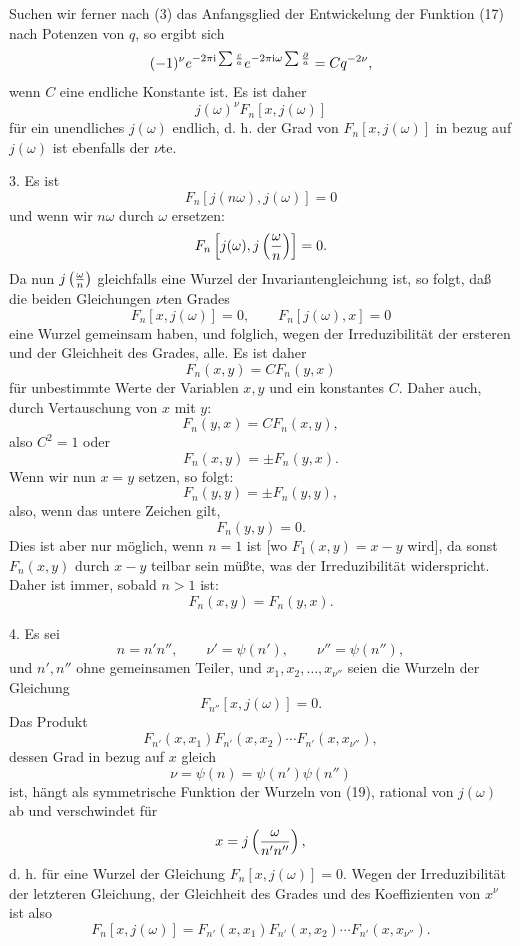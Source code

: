 \documentclass[11pt]{article}
\providecommand{\ii}{\mathrm{i}}
\begin{document}
Suchen wir ferner nach (3) das Anfangsglied der Entwickelung der Funktion (17) nach
Potenzen von $q$, so ergibt sich
\[
 (-1)^\nu e^{-2\pi\ii\sum {c\over a}}e^{-2\pi\ii\omega\sum {\partial\over a}}=Cq^{-2\nu},
\]
wenn $C$ eine endliche Konstante ist. Es ist daher
\[
 j(\omega)^\nu F_n[x,j(\omega)]
\]
für ein unendliches $j(\omega)$ endlich, d. h. der Grad von $F_n[x,j(\omega)]$ in bezug auf
$j(\omega)$ ist ebenfalls der $\nu$te.

3. Es ist
\[
 F_n[j(n\omega),j(\omega)]=0
\]
und wenn wir $n\omega$ durch $\omega$ ersetzen:
\[
 F_n\left[j(\omega),j\left({\omega\over n}\right)\right]=0.
\]
Da nun $j\left({\omega\over n}\right)$ gleichfalls eine Wurzel der Invariantengleichung ist,
so folgt, daß die beiden Gleichungen $\nu$ten Grades
\[
 F_n[x,j(\omega)]=0,
 \qquad
 F_n[j(\omega),x]=0
\]
eine Wurzel gemeinsam haben, und folglich, wegen der Irreduzibilität der ersteren und der
Gleichheit des Grades, alle. Es ist daher
\[
 F_n(x,y)=C F_n(y,x)
\]
für unbestimmte Werte der Variablen $x,y$ und ein konstantes $C$. Daher auch, durch
Vertauschung von $x$ mit $y$:
\[
 F_n(y,x)=C F_n(x,y),
\]
also $C^2=1$ oder
\[
 F_n(x,y)=\pm F_n(y,x).
\]
Wenn wir nun $x=y$ setzen, so folgt:
\[
 F_n(y,y)=\pm F_n(y,y),
\]
also, wenn das untere Zeichen gilt,
\[
 F_n(y,y)=0.
\]
Dies ist aber nur möglich, wenn $n=1$ ist [wo $F_1(x,y)=x-y$ wird], da sonst $F_n(x,y)$
durch $x-y$ teilbar sein müßte, was der Irreduzibilität widerspricht. Daher ist immer,
sobald $n>1$ ist:
\begin{equation}
 F_n(x,y)=F_n(y,x).
\tag{18}
\end{equation}

4. Es sei
\[
 n=n'n'',
 \qquad \nu'=\psi(n'),
 \qquad \nu''=\psi(n''),
\]
und $n',n''$ ohne gemeinsamen Teiler, und $x_1,x_2,\ldots,x_{\nu''}$ seien die Wurzeln
der Gleichung
\begin{equation}
 F_{n''}[x,j(\omega)]=0.
\tag{19}
\end{equation}
Das Produkt
\begin{equation}
 F_{n'}(x,x_1)F_{n'}(x,x_2)\cdots F_{n'}(x,x_{\nu''}),
\tag{20}
\end{equation}
dessen Grad in bezug auf $x$ gleich
\[
 \nu=\psi(n)=\psi(n')\psi(n'')
\]
ist, hängt als symmetrische Funktion der Wurzeln von (19), rational von $j(\omega)$ ab
und verschwindet für
\[
 x=j\left({\omega\over n'n''}\right),
\]
d. h. für eine Wurzel der Gleichung $F_n[x,j(\omega)]=0$. Wegen der Irreduzibilität der
letzteren Gleichung, der Gleichheit des Grades und des Koeffizienten von $x^\nu$ ist also
\begin{equation}
 F_n[x,j(\omega)]=F_{n'}(x,x_1)F_{n'}(x,x_2)\cdots F_{n'}(x,x_{\nu''}).
\tag{21}
\end{equation}
\end{document}
